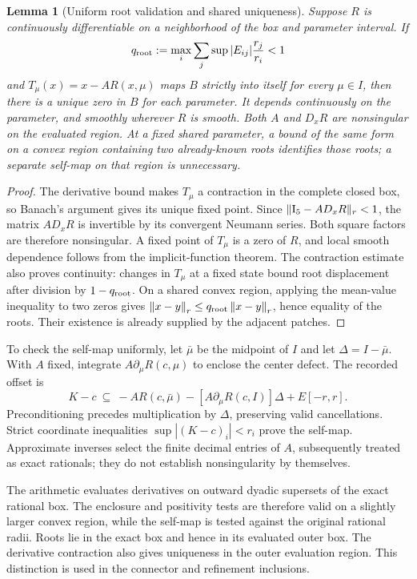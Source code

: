\documentclass[11pt,a4paper]{article}
\numberwithin{equation}{section}
\newtheorem{lemma}[theorem]{Lemma}
\newcommand{\normr}[1]{\left\|#1\right\|_r}
\begin{document}
\begin{lemma}[Uniform root validation and shared uniqueness]\label{lem:uniform}
Suppose $R$ is continuously differentiable on a neighborhood of the box and parameter interval. If
\begin{equation}
q_{\rm root}:=\max_i\sum_j\sup|E_{ij}|\frac{r_j}{r_i}<1\label{eq:root-norm}
\end{equation}
and $T_\mu(x)=x-A R(x,\mu)$ maps $B$ strictly into itself for every $\mu\in I$, then there is a unique zero in $B$ for each parameter. It depends continuously on the parameter, and smoothly wherever $R$ is smooth. Both $A$ and $D_xR$ are nonsingular on the evaluated region. At a fixed shared parameter, a bound of the same form on a convex region containing two already-known roots identifies those roots; a separate self-map on that region is unnecessary.
\end{lemma}
\begin{proof}
The derivative bound makes $T_\mu$ a contraction in the complete closed box, so Banach's argument gives its unique fixed point. Since $\|\mathrm I_5-A D_xR\|_r<1$, the matrix $A D_xR$ is invertible by its convergent Neumann series. Both square factors are therefore nonsingular. A fixed point of $T_\mu$ is a zero of $R$, and local smooth dependence follows from the implicit-function theorem. The contraction estimate also proves continuity: changes in $T_\mu$ at a fixed state bound root displacement after division by $1-q_{\rm root}$. On a shared convex region, applying the mean-value inequality to two zeros gives $\normr{x-y}\le q_{\rm root}\normr{x-y}$, hence equality of the roots. Their existence is already supplied by the adjacent patches.
\end{proof}

To check the self-map uniformly, let $\bar\mu$ be the midpoint of $I$ and let $\Delta=I-\bar\mu$. With $A$ fixed, integrate $A\partial_\mu R(c,\mu)$ to enclose the center defect. The recorded offset is
\begin{equation}
K-c\ \subseteq\ -A R(c,\bar\mu)
-[A\partial_\mu R(c,I)]\Delta+E[-r,r].\label{eq:center-offset}
\end{equation}
Preconditioning precedes multiplication by $\Delta$, preserving valid cancellations. Strict coordinate inequalities $\sup|(K-c)_i|<r_i$ prove the self-map. Approximate inverses select the finite decimal entries of $A$, subsequently treated as exact rationals; they do not establish nonsingularity by themselves.

The arithmetic evaluates derivatives on outward dyadic supersets of the exact rational box. The enclosure and positivity tests are therefore valid on a slightly larger convex region, while the self-map is tested against the original rational radii. Roots lie in the exact box and hence in its evaluated outer box. The derivative contraction also gives uniqueness in the outer evaluation region. This distinction is used in the connector and refinement inclusions.
\end{document}
